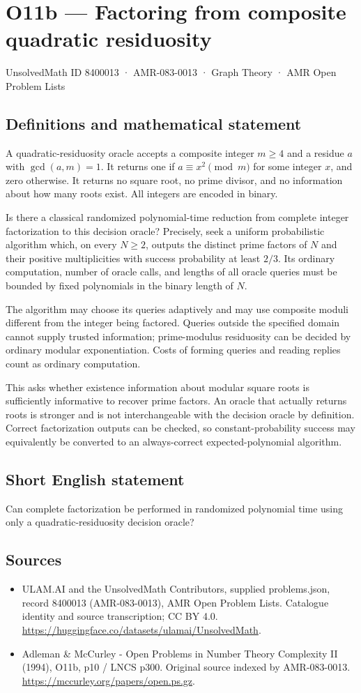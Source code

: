 \documentclass[11pt,a4paper]{article}
\begin{document}
\section*{O11b — Factoring from composite quadratic residuosity}\label{8400013}
{\small UnsolvedMath ID 8400013 · AMR-083-0013 · Graph Theory · AMR Open Problem Lists}
\subsection{Definitions and mathematical statement}
A quadratic-residuosity oracle accepts a composite integer $m\ge4$ and a residue $a$ with $\gcd(a,m)=1$. It returns one if $a\equiv x^2\pmod m$ for some integer $x$, and zero otherwise. It returns no square root, no prime divisor, and no information about how many roots exist. All integers are encoded in binary.

Is there a classical randomized polynomial-time reduction from complete integer factorization to this decision oracle? Precisely, seek a uniform probabilistic algorithm which, on every $N\ge2$, outputs the distinct prime factors of $N$ and their positive multiplicities with success probability at least $2/3$. Its ordinary computation, number of oracle calls, and lengths of all oracle queries must be bounded by fixed polynomials in the binary length of $N$.

The algorithm may choose its queries adaptively and may use composite moduli different from the integer being factored. Queries outside the specified domain cannot supply trusted information; prime-modulus residuosity can be decided by ordinary modular exponentiation. Costs of forming queries and reading replies count as ordinary computation.

This asks whether existence information about modular square roots is sufficiently informative to recover prime factors. An oracle that actually returns roots is stronger and is not interchangeable with the decision oracle by definition. Correct factorization outputs can be checked, so constant-probability success may equivalently be converted to an always-correct expected-polynomial algorithm.
\subsection{Short English statement}
Can complete factorization be performed in randomized polynomial time using only a quadratic-residuosity decision oracle?
\subsection{Sources}
\begin{itemize}
\item[S1] ULAM.AI and the UnsolvedMath Contributors, supplied problems.json, record 8400013 (AMR-083-0013), AMR Open Problem Lists. Catalogue identity and source transcription; CC BY 4.0.
\url{https://huggingface.co/datasets/ulamai/UnsolvedMath}.
\item[S2] Adleman \& McCurley - Open Problems in Number Theory Complexity II (1994), O11b, p10 / LNCS p300. Original source indexed by AMR-083-0013.
\url{https://mccurley.org/papers/open.ps.gz}.
\end{itemize}
\end{document}

